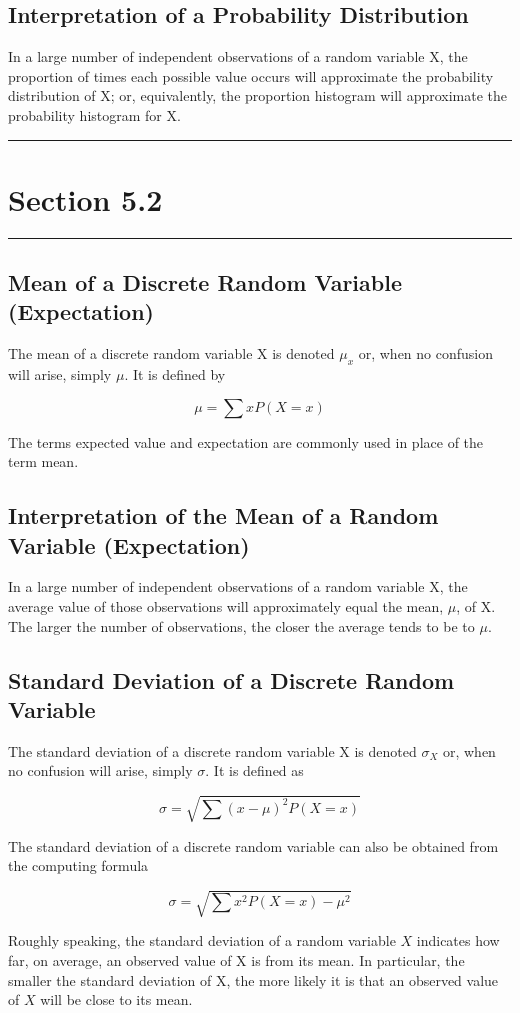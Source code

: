\documentclass[12pt]{article}
\begin{document}
        \subsection*{Interpretation of a Probability Distribution}
            In a large number of independent observations of a random variable X, the proportion of times
            each possible value occurs will approximate the probability distribution of X; or, equivalently,
            the proportion histogram will approximate the probability histogram for X.

    \noindent\rule{\textwidth}{0.4pt}
    \section*{Section 5.2}
    \noindent\rule{\textwidth}{0.4pt}
        \subsection*{Mean of a Discrete Random Variable (Expectation)}
            The mean of a discrete random variable X is denoted $\mu_x$ or, when no confusion will arise,
            simply $\mu$. It is defined by
            \begin{center}
                \[
                    \mu = \sum xP(X = x)    
                \]                  
            \end{center}
            The terms expected value and expectation are commonly used in place of the term mean.
        \subsection*{Interpretation of the Mean of a Random Variable (Expectation)}
            In a large number of independent observations of a random variable X, the average value of those
            observations will approximately equal the mean, $\mu$, of X. The larger the number of observations,
            the closer the average tends to be to $\mu$.
        \subsection*{Standard Deviation of a Discrete Random Variable}
            The standard deviation of a discrete random variable X is denoted $\sigma_X$ or, when no confusion
            will arise, simply $\sigma$. It is defined as
            \begin{center}
                \[
                    \sigma = \sqrt{\sum (x - \mu)^2 P(X = x)}    
                \]
            \end{center}
            The standard deviation of a discrete random variable can also be obtained from the computing 
            formula
            \begin{center}
                \[
                    \sigma = \sqrt{\sum x^2 P(X = x) - \mu^2}    
                \]
            \end{center}
            Roughly speaking, the standard deviation of a random variable $X$ indicates how far, on average,
            an observed value of X is from its mean. In particular, the smaller the standard deviation of X,
            the more likely it is that an observed value of $X$ will be close to its mean.
\end{document}
